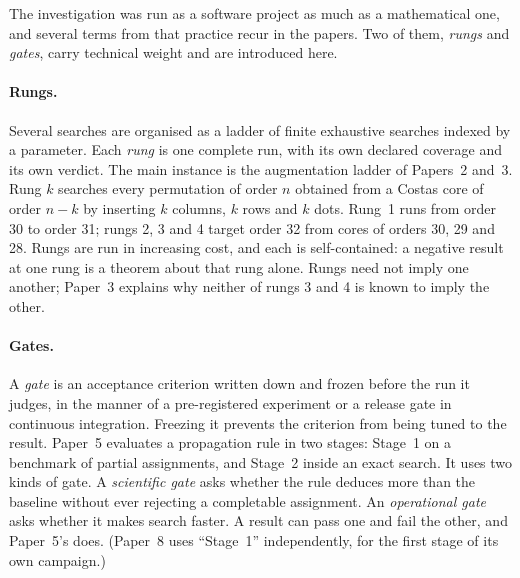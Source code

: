 The investigation was run as a software project as much as a mathematical one, and several terms
from that practice recur in the papers. Two of them, \emph{rungs} and \emph{gates}, carry technical
weight and are introduced here.

\paragraph{Rungs.} Several searches are organised as a ladder of finite exhaustive searches indexed
by a parameter. Each \emph{rung} is one complete run, with its own declared coverage and its own
verdict. The main instance is the augmentation ladder of Papers~2 and~3. Rung $k$ searches every
permutation of order $n$ obtained from a Costas core of order $n-k$ by inserting $k$ columns, $k$
rows and $k$ dots. Rung~1 runs from order 30 to order 31; rungs 2, 3 and 4 target order 32 from
cores of orders 30, 29 and 28. Rungs are run in
increasing cost, and each is self-contained: a negative result at one rung is a theorem about that
rung alone. Rungs need not imply one another; Paper~3 explains why neither of rungs 3 and 4 is known to imply the other.

\paragraph{Gates.} A \emph{gate} is an acceptance criterion written down and frozen before the run
it judges, in the manner of a pre-registered experiment or a release gate in continuous
integration. Freezing it prevents the criterion from being tuned to the result. Paper~5 evaluates a
propagation rule in two stages: Stage~1 on a benchmark of partial assignments, and Stage~2 inside an
exact search. It uses two kinds of gate. A \emph{scientific gate} asks whether the rule deduces
more than the baseline without ever rejecting a completable assignment. An \emph{operational gate}
asks whether it makes search faster. A result can pass one and fail the other, and Paper~5's does. (Paper~8 uses ``Stage~1'' independently, for the first stage of its own campaign.)


